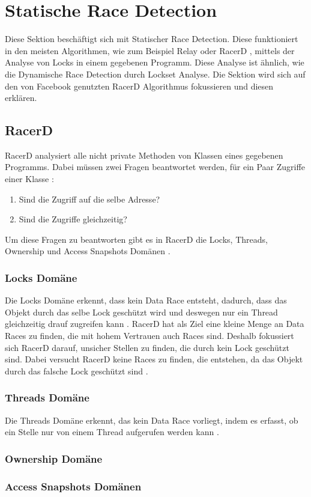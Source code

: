 \section{Statische Race Detection}

Diese Sektion beschäftigt sich mit Statischer Race Detection. Diese funktioniert in den meisten Algorithmen, wie zum Beispiel Relay \cite[vgl.][208]{relay} oder RacerD \cite[vgl.][57]{nikos_2019}, mittels der Analyse von Locks in einem gegebenen Programm. Diese Analyse ist ähnlich, wie die Dynamische Race Detection durch Lockset Analyse. Die Sektion wird sich auf den von Facebook genutzten RacerD Algorithmus \cite[vgl.][2]{racerd} fokussieren und diesen erklären. 

\subsection*{RacerD}

RacerD analysiert alle nicht private Methoden von Klassen eines gegebenen Programms. Dabei müssen zwei Fragen beantwortet werden, für ein Paar Zugriffe einer Klasse \cite[vgl.][7]{racerd}:

\begin{enumerate}
	\item Sind die Zugriff auf die selbe Adresse?
	\item Sind die Zugriffe gleichzeitig?
\end{enumerate}

Um diese Fragen zu beantworten gibt es in RacerD die Locks, Threads, Ownership und Access Snapshots Domänen \cite[vgl.][7-8]{racerd}. 

\subsubsection*{Locks Domäne}

Die Locks Domäne erkennt, dass kein Data Race entsteht, dadurch, dass das Objekt durch das selbe Lock geschützt wird und deswegen nur ein Thread gleichzeitig drauf zugreifen kann \cite[vgl.][8]{racerd}. RacerD hat als Ziel eine kleine Menge an Data Races zu finden, die mit hohem Vertrauen auch Races sind. Deshalb fokussiert sich RacerD darauf, unsicher Stellen zu finden, die durch kein Lock geschützt sind. Dabei versucht RacerD keine Races zu finden, die entstehen, da das Objekt durch das falsche Lock geschützt sind \cite[vgl.][9]{racerd}. 

\subsubsection*{Threads Domäne}

Die Threads Domäne erkennt, das kein Data Race vorliegt, indem es erfasst, ob ein Stelle nur von einem Thread aufgerufen werden kann \cite[vgl.][8]{racerd}.

\subsubsection*{Ownership Domäne}

\subsubsection*{Access Snapshots Domänen}